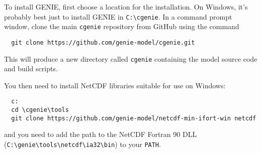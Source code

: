 \documentclass[a4paper,10pt,article]{memoir}
\begin{document}
To install GENIE, first choose a location for the installation.  On
Windows, it's probably best just to install GENIE in
\texttt{C:\textbackslash{}cgenie}.  In a command prompt window, clone
the main \texttt{cgenie} repository from GitHub using the command
\begin{verbatim}
  git clone https://github.com/genie-model/cgenie.git
\end{verbatim}
This will produce a new directory called \texttt{cgenie} containing
the model source code and build scripts.

You then need to install NetCDF libraries suitable for use on Windows:
\begin{verbatim}
  c:
  cd \cgenie\tools
  git clone https://github.com/genie-model/netcdf-min-ifort-win netcdf
\end{verbatim}
and you need to add the path to the NetCDF Fortran 90 DLL
(\texttt{C:\textbackslash{}genie\textbackslash{}tools\textbackslash{}netcdf\textbackslash{}ia32\textbackslash{}bin})
to your \texttt{PATH}.
\end{document}
